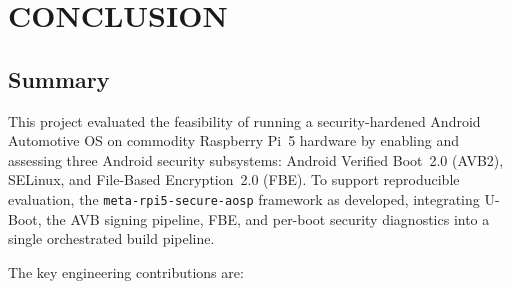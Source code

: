 \chapter{CONCLUSION}
\label{ch:conclusion}

\section{Summary}

This project evaluated the feasibility of running a security-hardened Android Automotive OS on commodity Raspberry Pi~5 hardware by enabling and assessing three Android security subsystems: Android Verified Boot~2.0 (AVB2), SELinux, and File-Based Encryption~2.0 (FBE). To support reproducible evaluation, the \texttt{meta-rpi5-secure-aosp} framework as developed, integrating U-Boot, the AVB signing pipeline, FBE, and per-boot security diagnostics into a single orchestrated build pipeline.

The key engineering contributions are:


